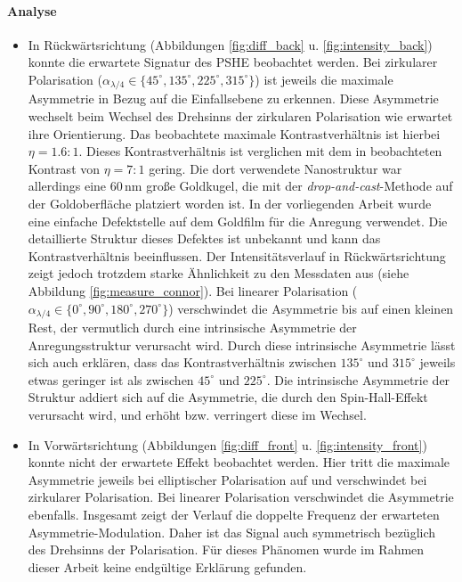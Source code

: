 \documentclass[a4paper, titlepage,  ngerman, fullpage]{book}
\begin{document}
		\paragraph{Analyse}
		\begin{itemize}
			\item In Rückwärtsrichtung (Abbildungen \ref{fig:diff_back} u. \ref{fig:intensity_back}) konnte die erwartete Signatur des PSHE beobachtet werden. Bei zirkularer Polarisation ($\alpha_{\lambda/4} \in \{45^\circ, 135^\circ, 225^\circ, 315^\circ\}$) ist jeweils die maximale Asymmetrie in Bezug auf die Einfallsebene zu erkennen. Diese Asymmetrie wechselt beim Wechsel des Drehsinns der zirkularen Polarisation wie erwartet ihre Orientierung. Das beobachtete maximale Kontrastverhältnis ist hierbei $\eta = 1.6:1$. Dieses Kontrastverhältnis ist verglichen mit dem in \cite{OConnor.2014} beobachteten Kontrast von $\eta =7:1$ gering.  Die dort verwendete Nanostruktur war allerdings eine  $60\,\mathrm{nm}$ große Goldkugel, die mit der \textit{drop-and-cast}-Methode auf der Goldoberfläche platziert worden ist. In der vorliegenden Arbeit wurde eine einfache Defektstelle auf dem Goldfilm für die Anregung verwendet. Die detaillierte Struktur dieses Defektes ist unbekannt und kann das Kontrastverhältnis beeinflussen. Der Intensitätsverlauf in Rückwärtsrichtung zeigt jedoch trotzdem starke Ähnlichkeit zu den Messdaten aus \cite{OConnor.2014} (siehe Abbildung \ref{fig:measure_connor}). Bei linearer Polarisation ($\alpha_{\lambda/4} \in \{0^\circ, 90^\circ, 180^\circ, 270^\circ\}$) verschwindet die Asymmetrie bis auf einen kleinen Rest, der vermutlich durch eine intrinsische Asymmetrie der Anregungsstruktur verursacht wird. Durch diese intrinsische Asymmetrie lässt sich auch erklären, dass das Kontrastverhältnis zwischen $135^\circ$ und $ 315^\circ$ jeweils etwas geringer ist als zwischen $45^\circ$ und $225^\circ$.
			Die intrinsische Asymmetrie der Struktur addiert sich auf die Asymmetrie, die durch den Spin-Hall-Effekt verursacht wird, und erhöht bzw. verringert diese im Wechsel.
			\item In Vorwärtsrichtung (Abbildungen \ref{fig:diff_front} u. \ref{fig:intensity_front}) konnte nicht der erwartete Effekt beobachtet werden. Hier tritt die maximale Asymmetrie jeweils bei elliptischer Polarisation auf und verschwindet bei zirkularer Polarisation. Bei linearer Polarisation verschwindet die Asymmetrie ebenfalls. Insgesamt zeigt der Verlauf die doppelte Frequenz der erwarteten Asymmetrie-Modulation. Daher ist das Signal auch symmetrisch bezüglich des Drehsinns der Polarisation. Für dieses Phänomen wurde im Rahmen dieser Arbeit keine endgültige Erklärung gefunden.
			

\end{itemize}
\end{document}
